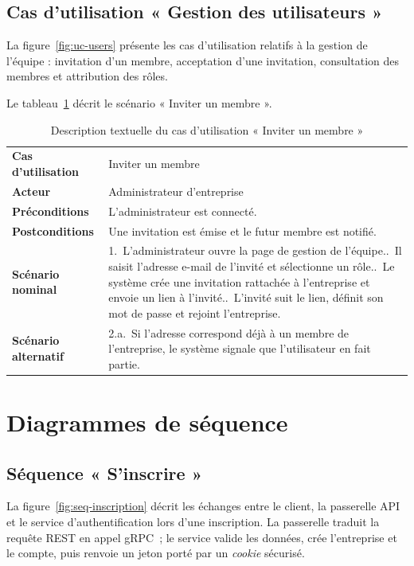 \subsection{Cas d'utilisation « Gestion des utilisateurs »}
La figure~\ref{fig:uc-users} présente les cas d'utilisation relatifs à la
gestion de l'équipe : invitation d'un membre, acceptation d'une invitation,
consultation des membres et attribution des rôles.


Le tableau~\ref{tab:uc-invite} décrit le scénario « Inviter un membre ».

\begin{table}[H]
\centering
\caption{Description textuelle du cas d'utilisation « Inviter un membre »}
\label{tab:uc-invite}
\small
\begin{tabularx}{\linewidth}{lX}
\toprule
\textbf{Cas d'utilisation} & Inviter un membre \\
\textbf{Acteur} & Administrateur d'entreprise \\
\textbf{Préconditions} & L'administrateur est connecté. \\
\textbf{Postconditions} & Une invitation est émise et le futur membre est notifié. \\
\midrule
\textbf{Scénario nominal} &
1.~L'administrateur ouvre la page de gestion de l'équipe.\newline
2.~Il saisit l'adresse e-mail de l'invité et sélectionne un rôle.\newline
3.~Le système crée une invitation rattachée à l'entreprise et envoie un lien à l'invité.\newline
4.~L'invité suit le lien, définit son mot de passe et rejoint l'entreprise. \\
\midrule
\textbf{Scénario alternatif} &
2.a.~Si l'adresse correspond déjà à un membre de l'entreprise, le système signale que l'utilisateur en fait partie. \\
\bottomrule
\end{tabularx}
\end{table}

\section{Diagrammes de séquence}

\subsection{Séquence « S'inscrire »}
La figure~\ref{fig:seq-inscription} décrit les échanges entre le client, la
passerelle API et le service d'authentification lors d'une inscription. La
passerelle traduit la requête REST en appel gRPC~; le service valide les
données, crée l'entreprise et le compte, puis renvoie un jeton porté par un
\emph{cookie} sécurisé.

